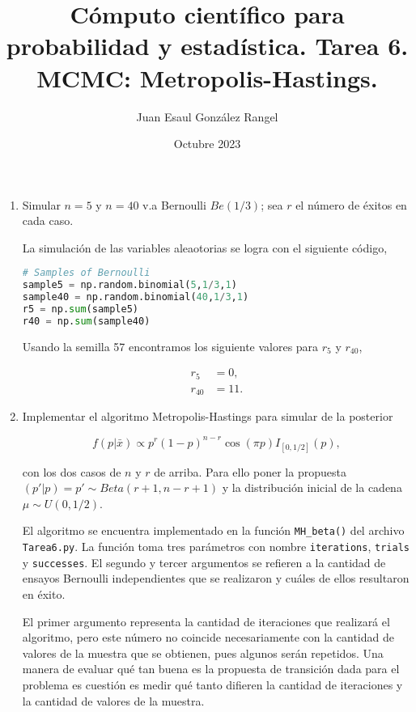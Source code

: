 \documentclass{article}
\title{Cómputo científico para probabilidad y estadística. Tarea 6.\\
MCMC: Metropolis-Hastings.}
\author{Juan Esaul González Rangel}
\date{Octubre 2023}
\begin{document}
\maketitle


\begin{enumerate}

    \item  Simular $n = 5$ y $n = 40$ v.a Bernoulli $Be(1/3)$; sea $r$ el número de
éxitos en cada caso.

    La simulación de las variables aleaotorias se logra con el siguiente código,

    \begin{lstlisting}[language=Python]
# Samples of Bernoulli
sample5 = np.random.binomial(5,1/3,1)
sample40 = np.random.binomial(40,1/3,1)
r5 = np.sum(sample5)
r40 = np.sum(sample40)\end{lstlisting}

    Usando la semilla 57 encontramos los siguiente valores para $r_5$ y $r_{40}$,

    \begin{align*}
        r_5 &= 0,\\
        r_{40} &= 11.
    \end{align*}

    \item Implementar el algoritmo Metropolis-Hastings para simular de la posterior
    
    \[f (p|\bar{x}) \propto p^r(1 - p)^{n-r} \cos(\pi p)I_{[0, 1/2 ]}(p),\]

    con los dos casos de $n$ y $r$ de arriba. Para ello poner la propuesta $(p'|p) = p' \sim Beta(r + 1, n - r + 1)$ 
    y la distribución inicial de la cadena $\mu \sim U (0, 1/2 )$.

    El algoritmo se encuentra implementado en la función \texttt{MH\_beta()} del archivo
    \texttt{Tarea6.py}. La función toma tres parámetros con nombre \texttt{iterations}, \texttt{trials}
    y \texttt{successes}. El segundo y tercer argumentos se refieren a la cantidad de ensayos
    Bernoulli independientes que se realizaron y cuáles de ellos resultaron en éxito. 
    
    El primer argumento representa la cantidad de iteraciones que realizará el algoritmo, pero
    este número no coincide necesariamente con la cantidad de valores de la muestra que
    se obtienen, pues algunos serán repetidos. Una manera de evaluar qué tan buena es la
    propuesta de transición dada para el problema es cuestión es medir qué tanto 
    difieren la cantidad de iteraciones y la cantidad de valores de la muestra.


\end{enumerate}
\end{document}
